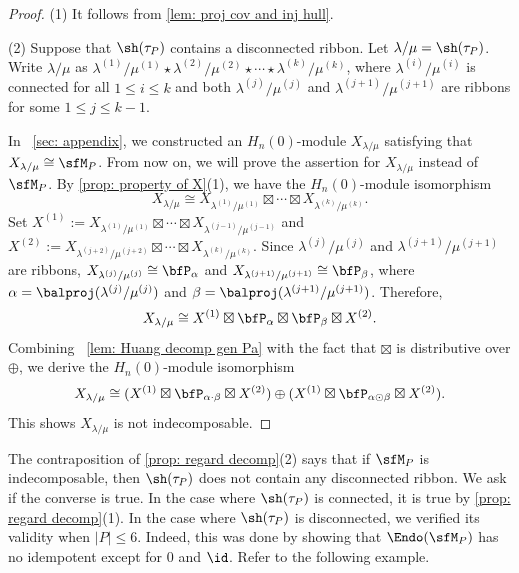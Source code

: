 \documentclass[12pt, reqno]{amsart}
\theoremstyle{definition}
\numberwithin{equation}{section} \numberwithin{figure}{section}
\numberwithin{table}{section}
\begin{document}
\begin{proof}
(1) It follows from \cref{lem: proj cov and inj hull}.

(2) 
Suppose that $\sh(\tau_P)$  contains a disconnected ribbon.
Let $\lambda/\mu = \sh(\tau_P)$.
Write $\lambda/\mu$ as $\lambda^{(1)} / \mu^{(1)} \star \lambda^{(2)} / \mu^{(2)} \star \cdots \star \lambda^{(k)} / \mu^{(k)}$, where  $\lambda^{(i)} / \mu^{(i)}$ is connected for all $1 \le i \le k$ and  both $\lambda^{(j)} / \mu^{(j)}$ and $\lambda^{(j+1)} / \mu^{(j+1)}$ are ribbons for some $1 \leq j \leq k-1$.

In ~\cref{sec: appendix}, we constructed an $H_n(0)$-module $X_{\lambda/\mu}$ satisfying that  
$X_{\lambda/\mu} \cong \sfM_P$. 
From now on, we will prove the assertion for $X_{\lambda/\mu}$ instead of $\sfM_P$.
By \cref{prop: property of X}(1), we have the $H_n(0)$-module isomorphism 
\[
X_{\lambda/\mu} \cong X_{\lambda^{(1)}/\mu^{(1)}} \boxtimes \cdots \boxtimes X_{\lambda^{(k)}/\mu^{(k)}}.
\]
Set $X^{(1)} := X_{\lambda^{(1)} / \mu^{(1)}}  
\boxtimes \cdots \boxtimes  X_{\lambda^{(j-1)} / \mu^{(j-1)}}$ and $X^{(2)} := X_{\lambda^{(j+2)} / \mu^{(j+2)}} \boxtimes \cdots \boxtimes X_{\lambda^{(k)} / \mu^{(k)}}$.
Since $\lambda^{(j)}/\mu^{(j)}$ and $\lambda^{(j+1)}/\mu^{(j+1)}$ are ribbons, 
$X_{\lambda^{(j)}/\mu^{(j)}} \cong \bfP_\alpha$ and $X_{\lambda^{(j+1)}/\mu^{(j+1)}}  \cong \bfP_\beta$, where
$\alpha = \balproj(\lambda^{(j)} / \mu^{(j)})$ and $\beta = \balproj(\lambda^{(j+1)} / \mu^{(j+1)})$.
Therefore, 
\[
X_{\lambda/\mu}
\cong X^{(1)} \boxtimes \bfP_\alpha \boxtimes \bfP_\beta \boxtimes X^{(2)}.
\]
Combining
~\cref{lem: Huang decomp gen Pa} with the  fact that $\boxtimes$ is distributive over $\oplus$, we derive the $H_n(0)$-module isomorphism
\[
X_{\lambda/\mu} \cong 
(X^{(1)} \boxtimes \bfP_{\alpha \cdot \beta} \boxtimes X^{(2)})
\oplus
(X^{(1)}
\boxtimes \bfP_{\alpha \odot \beta} \boxtimes X^{(2)}).
\]
This shows $X_{\lambda/\mu}$ is not indecomposable.
\end{proof}

The contraposition of \cref{prop: regard decomp}(2) says that 
if $\sfM_P$ is indecomposable, then $\sh(\tau_P)$ does not contain any disconnected ribbon.
We ask if the converse is true.
In the case where $\sh(\tau_P)$ is connected, it is true by \cref{prop: regard decomp}(1).
In the case where $\sh(\tau_P)$ is disconnected,
we verified its validity when $|P| \leq 6$.
Indeed, this was done by showing that 
$\Endo(\sfM_P)$ has no idempotent  except for $0$ and $\id$.
Refer to the following example.
\end{document}
